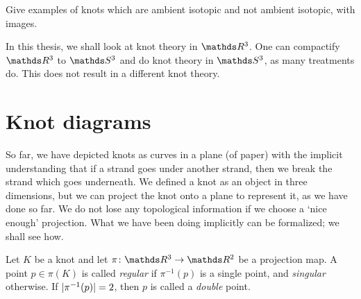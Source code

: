 Give examples of knots which are ambient isotopic and not ambient isotopic, with images.

\begin{remark}
    In this thesis, we shall look at knot theory in \(\rthree\). One can compactify \(\rthree\) to \(\sthree\) and do knot theory in \(\sthree\), as many treatments do. This does not result in a different knot theory.
\end{remark}

\section{Knot diagrams}

So far, we have depicted knots as curves in a plane (of paper) with the implicit understanding that if a strand goes under another strand, then we break the strand which goes underneath. We defined a knot as an object in three dimensions, but we can project the knot onto a plane to represent it, as we have done so far. We do not lose any topological information if we choose a `nice enough' projection. What we have been doing implicitly can be formalized; we shall see how.

Let \(K\) be a knot and let \(\pi \colon \rthree \rightarrow \rtwo\) be a projection map. A point \(p \in \pi(K)\) is called \textit{regular} if \(\pi^{-1}(p)\) is a single point, and \textit{singular} otherwise. If \(\lvert\pi^{-1}(p)\rvert = 2\), then \(p\) is called a \textit{double} point.


%
%
%

%
%


